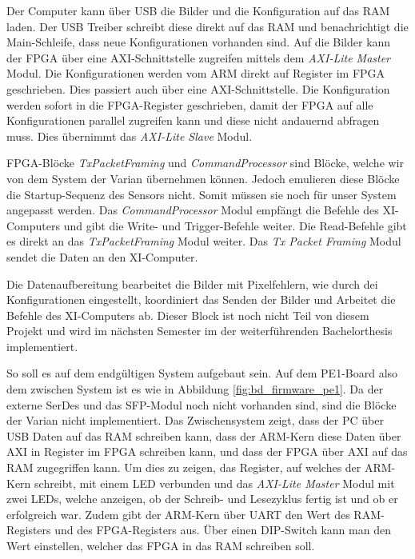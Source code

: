 \documentclass{article}
\begin{document}
Der Computer kann über USB die Bilder und die Konfiguration auf das RAM laden. Der USB Treiber schreibt diese direkt auf das RAM und benachrichtigt die Main-Schleife, dass neue Konfigurationen vorhanden sind. Auf die Bilder kann der FPGA über eine AXI-Schnittstelle zugreifen mittels dem \textit{AXI-Lite Master} Modul. Die Konfigurationen werden vom ARM direkt auf Register im FPGA geschrieben. Dies passiert auch über eine AXI-Schnittstelle. Die Konfiguration werden sofort in die FPGA-Register geschrieben, damit der FPGA auf alle Konfigurationen parallel zugreifen kann und diese nicht andauernd abfragen muss. Dies übernimmt das \textit{AXI-Lite Slave} Modul.

FPGA-Blöcke \textit{TxPacketFraming} und \textit{CommandProcessor} sind Blöcke, welche wir von dem System der Varian übernehmen können. Jedoch emulieren diese Blöcke die Startup-Sequenz des Sensors nicht. Somit müssen sie noch für unser System angepasst werden. Das \textit{CommandProcessor} Modul empfängt die Befehle des XI-Computers und gibt die Write- und Trigger-Befehle weiter. Die Read-Befehle gibt es direkt an das \textit{TxPacketFraming} Modul weiter. 
Das \textit{Tx Packet Framing} Modul sendet die Daten an den XI-Computer.

Die Datenaufbereitung bearbeitet die Bilder mit Pixelfehlern, wie durch dei Konfigurationen eingestellt, koordiniert das Senden der Bilder und Arbeitet die Befehle des XI-Computers ab. Dieser Block ist noch nicht Teil von diesem Projekt und wird im nächsten Semester im der weiterführenden Bachelorthesis implementiert.

So soll es auf dem endgültigen System aufgebaut sein. Auf dem PE1-Board also dem zwischen System ist es wie in Abbildung \ref{fig:bd_firmware_pe1}. Da der externe SerDes und das SFP-Modul noch nicht vorhanden sind, sind die Blöcke der Varian nicht implementiert. Das Zwischensystem zeigt, dass der PC über USB Daten auf das RAM schreiben kann, dass der ARM-Kern diese Daten über AXI in Register im FPGA schreiben kann, und dass der FPGA über AXI auf das RAM zugegriffen kann. Um dies zu zeigen, das Register, auf welches der ARM-Kern schreibt, mit einem LED verbunden und das \textit{AXI-Lite Master} Modul mit zwei LEDs, welche anzeigen, ob der Schreib- und Lesezyklus fertig ist und ob er erfolgreich war. Zudem gibt der ARM-Kern über UART den Wert des RAM-Registers und des FPGA-Registers aus. Über einen DIP-Switch kann man den Wert einstellen, welcher das FPGA in das RAM schreiben soll. 
\end{document}
